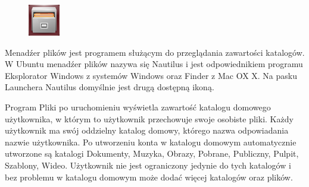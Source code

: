 \begin{figure}
                \includegraphics[width=\linewidth]{images/ikony_pliki.png}
\end{figure}

Menadźer plików jest programem służącym do przeglądania zawartości katalogów. W Ubuntu menadźer plików nazywa się \textcolor{ubuntu_orange}{Nautilus} i jest odpowiednikiem programu \textcolor{ubuntu_orange}{Eksplorator Windows} z systemów Windows oraz \textcolor{ubuntu_orange}{Finder} z Mac OX X. Na pasku Launchera Nautilus domyślnie jest drugą dostępną ikoną. 

Program Pliki po uruchomieniu wyświetla zawartość katalogu domowego użytkownika, w którym to użytkownik przechowuje swoje osobiste pliki. Każdy użytkownik ma swój oddzielny katalog domowy, którego nazwa odpowiadania nazwie użytkownika. Po utworzeniu konta w katalogu domowym automatycznie utworzone są katalogi Dokumenty, Muzyka, Obrazy, Pobrane, Publiczny, Pulpit, Szablony, Wideo. Użytkownik nie jest ograniczony jedynie do tych katalogów i bez problemu w katalogu domowym może dodać więcej katalogów oraz plików.

